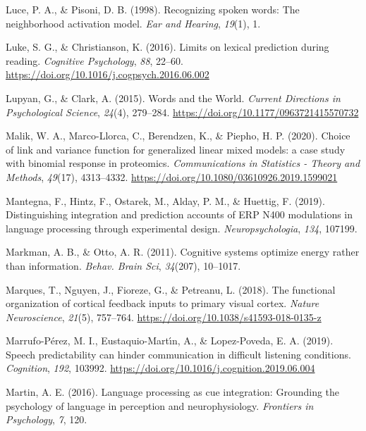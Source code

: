 \documentclass[a4paper, nobind]{templates/ociamthesis}
\newlength{\cslhangindent}
\newenvironment{CSLReferences}[2] %
 {%
  \setlength{\parindent}{0pt}
  \ifodd #1
  \let\oldpar\par
  \def\par{\hangindent=\cslhangindent\oldpar}
  \fi
  \setlength{\parskip}{1mm}
  \setlength{\baselineskip}{6mm}
 }%
 {}
\begin{document}
\begin{CSLReferences}{1}{0}
\leavevmode{}%
Luce, P. A., \& Pisoni, D. B. (1998). Recognizing spoken words: The neighborhood activation model. \emph{Ear and Hearing}, \emph{19}(1), 1.

\leavevmode{}%
Luke, S. G., \& Christianson, K. (2016). Limits on lexical prediction during reading. \emph{Cognitive Psychology}, \emph{88}, 22--60. \url{https://doi.org/10.1016/j.cogpsych.2016.06.002}

\leavevmode{}%
Lupyan, G., \& Clark, A. (2015). Words and the World. \emph{Current Directions in Psychological Science}, \emph{24}(4), 279--284. \url{https://doi.org/10.1177/0963721415570732}

\leavevmode{}%
Malik, W. A., Marco-Llorca, C., Berendzen, K., \& Piepho, H. P. (2020). {Choice of link and variance function for generalized linear mixed models: a case study with binomial response in proteomics}. \emph{Communications in Statistics - Theory and Methods}, \emph{49}(17), 4313--4332. \url{https://doi.org/10.1080/03610926.2019.1599021}

\leavevmode{}%
Mantegna, F., Hintz, F., Ostarek, M., Alday, P. M., \& Huettig, F. (2019). Distinguishing integration and prediction accounts of ERP N400 modulations in language processing through experimental design. \emph{Neuropsychologia}, \emph{134}, 107199.

\leavevmode{}%
Markman, A. B., \& Otto, A. R. (2011). Cognitive systems optimize energy rather than information. \emph{Behav. Brain Sci}, \emph{34}(207), 10--1017.

\leavevmode{}%
Marques, T., Nguyen, J., Fioreze, G., \& Petreanu, L. (2018). The functional organization of cortical feedback inputs to primary visual cortex. \emph{Nature Neuroscience}, \emph{21}(5), 757--764. \url{https://doi.org/10.1038/s41593-018-0135-z}

\leavevmode{}%
Marrufo-Pérez, M. I., Eustaquio-Martı́n, A., \& Lopez-Poveda, E. A. (2019). Speech predictability can hinder communication in difficult listening conditions. \emph{Cognition}, \emph{192}, 103992. \url{https://doi.org/10.1016/j.cognition.2019.06.004}

\leavevmode{}%
Martin, A. E. (2016). Language processing as cue integration: Grounding the psychology of language in perception and neurophysiology. \emph{Frontiers in Psychology}, \emph{7}, 120.


\end{CSLReferences}
\end{document}
